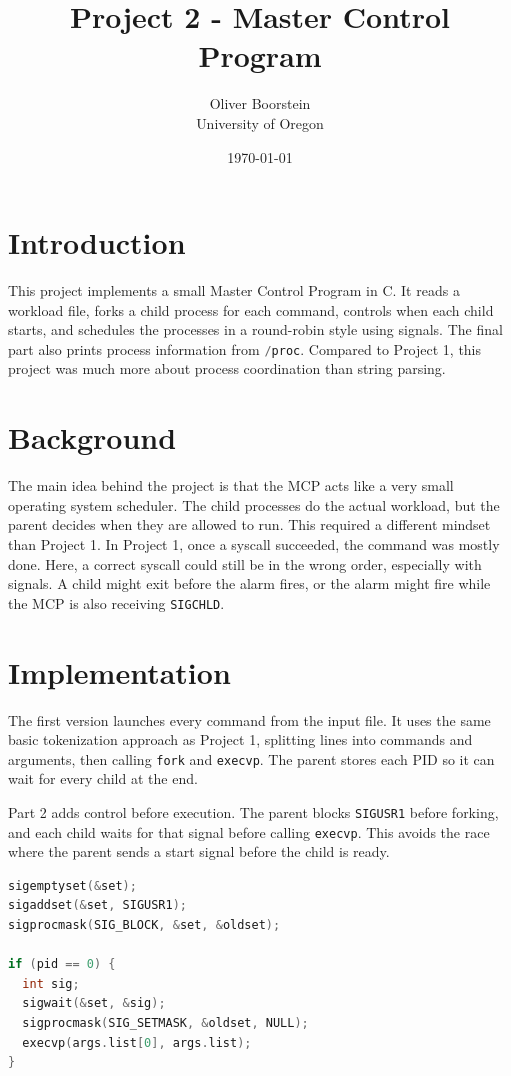 \documentclass[12pt]{article}
\title{Project 2 - Master Control Program}
\author{Oliver Boorstein \\ University of Oregon}
\date{\today}
\begin{document}
\maketitle
\pagebreak

\section{Introduction}
This project implements a small Master Control Program in C. It reads a workload file, forks a child process for each command, controls when each child starts, and schedules the processes in a round-robin style using signals. The final part also prints process information from \lstinline[language=C]|/proc|. Compared to Project 1, this project was much more about process coordination than string parsing.

\section{Background}
The main idea behind the project is that the MCP acts like a very small operating system scheduler. The child processes do the actual workload, but the parent decides when they are allowed to run. This required a different mindset than Project 1. In Project 1, once a syscall succeeded, the command was mostly done. Here, a correct syscall could still be in the wrong order, especially with signals. A child might exit before the alarm fires, or the alarm might fire while the MCP is also receiving \lstinline[language=C]|SIGCHLD|.

\section{Implementation}
The first version launches every command from the input file. It uses the same basic tokenization approach as Project 1, splitting lines into commands and arguments, then calling \lstinline[language=C]|fork| and \lstinline[language=C]|execvp|. The parent stores each PID so it can wait for every child at the end.

Part 2 adds control before execution. The parent blocks \lstinline[language=C]|SIGUSR1| before forking, and each child waits for that signal before calling \lstinline[language=C]|execvp|. This avoids the race where the parent sends a start signal before the child is ready.

\begin{lstlisting}[language=C]
sigemptyset(&set);
sigaddset(&set, SIGUSR1);
sigprocmask(SIG_BLOCK, &set, &oldset);

if (pid == 0) {
  int sig;
  sigwait(&set, &sig);
  sigprocmask(SIG_SETMASK, &oldset, NULL);
  execvp(args.list[0], args.list);
}
\end{lstlisting}
\end{document}
